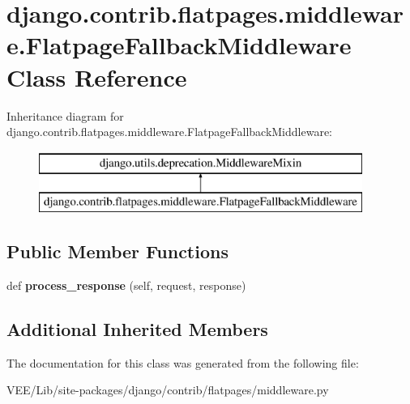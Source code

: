 \hypertarget{classdjango_1_1contrib_1_1flatpages_1_1middleware_1_1_flatpage_fallback_middleware}{}\section{django.\+contrib.\+flatpages.\+middleware.\+Flatpage\+Fallback\+Middleware Class Reference}
\label{classdjango_1_1contrib_1_1flatpages_1_1middleware_1_1_flatpage_fallback_middleware}
Inheritance diagram for django.\+contrib.\+flatpages.\+middleware.\+Flatpage\+Fallback\+Middleware\+:\begin{figure}[H]
\begin{center}
\leavevmode
\includegraphics[height=2.000000cm]{classdjango_1_1contrib_1_1flatpages_1_1middleware_1_1_flatpage_fallback_middleware}
\end{center}
\end{figure}
\subsection*{Public Member Functions}
\begin{DoxyCompactItemize}
\item 
\mbox{\label{classdjango_1_1contrib_1_1flatpages_1_1middleware_1_1_flatpage_fallback_middleware_ad329568ff511e714811b927d908b5ad2}} 
def {\bfseries process\+\_\+response} (self, request, response)
\end{DoxyCompactItemize}
\subsection*{Additional Inherited Members}


The documentation for this class was generated from the following file\+:\begin{DoxyCompactItemize}
\item 
V\+E\+E/\+Lib/site-\/packages/django/contrib/flatpages/middleware.\+py\end{DoxyCompactItemize}
